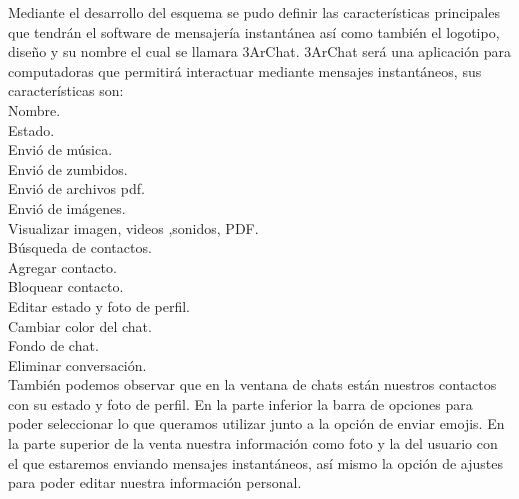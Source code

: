\documentclass[11pt,a4paper]{report}
\begin{document}
Mediante el desarrollo del esquema se pudo definir las características principales que\vspace{0,5cm} tendrán el software de mensajería instantánea así como también el logotipo, diseño  y su\vspace{0,5cm} nombre el cual se llamara 3ArChat. 
3ArChat  será una aplicación para computadoras que\vspace{0,5cm} permitirá interactuar mediante mensajes instantáneos, sus características son:\newline\\ 
Nombre.\newline\\
Estado.\newline\\ 
Envió de música.\newline\\ 
Envió de zumbidos.\newline\\
Envió de archivos pdf.\newline\\ 
Envió de imágenes.\newline\\ 
Visualizar imagen, videos ,sonidos, PDF.\newline\\ 
Búsqueda de contactos.\newline\\
Agregar contacto.\newline\\ 
Bloquear contacto.\newline\\ 
Editar estado y foto de perfil.\newline\\
Cambiar color del chat.\newline\\ 
Fondo  de chat.\newline\\ 
Eliminar conversación.\newline\\ 
También\vspace{0,5cm} podemos observar que en la ventana de chats están nuestros contactos con su estado y foto\vspace{0,5cm} de perfil. En la parte inferior la barra de opciones para poder seleccionar lo que queramos\vspace{0,5cm} utilizar junto a la opción de enviar emojis.
En la parte superior de la venta nuestra\vspace{0,5cm} información como foto y la del usuario con el que estaremos enviando mensajes instantáneos,\vspace{0,5cm} así mismo la opción de ajustes para poder editar nuestra información personal.\newpage
\end{document}

